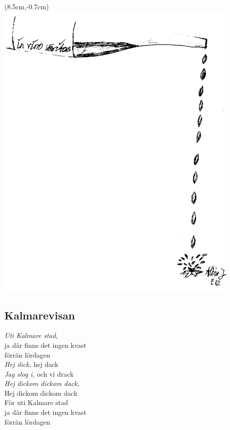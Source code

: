 \newpage


\begin{textblock*}{3cm}(8.5cm,-0.7cm) %
    \includegraphics[width=12cm]{./bilder/in_vino_veritas.png}
\end{textblock*}

\subsection*{Kalmarevisan} 

\noindent \textit{Uti Kalmare stad,} \\
\noindent ja där finns det ingen kvast \\
\noindent förrän lördagen \\

\noindent \textit{Hej dick,} hej dack\\
\noindent \textit{Jag slog i,} och vi drack\\
\noindent \textit{Hej dickom dickom dack,}\\
\noindent Hej dickom dickom dack\\
\noindent För uti Kalmare stad\\
\noindent ja där finns det ingen kvast\\
\noindent förrän lördagen\\

